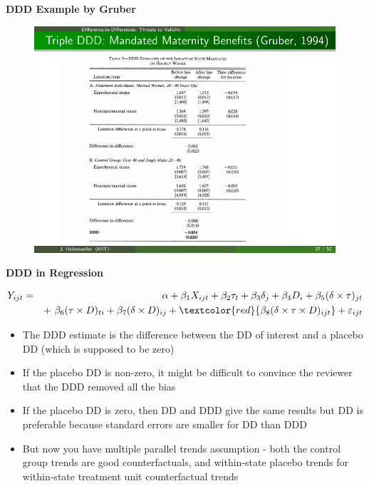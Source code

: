 \documentclass[notes=show]{beamer}
\begin{document}
\begin{frame}[plain]
	\begin{center}
	\textbf{DDD Example by Gruber}
	\end{center}
	
	\begin{figure}
	\includegraphics{./lecture_includes/gruber_ddd_3.pdf}
	\end{figure}
	
\end{frame}

\begin{frame}[plain]
	\begin{center}
	\textbf{DDD in Regression}
	\end{center}
	
	\begin{eqnarray*}
	Y_{ijt} &=& \alpha + \beta_1 X_{ijt} + \beta_2 \tau_t + \beta_3 \delta_j  + \beta_4 D_i + \beta_5(\delta \times \tau)_{jt} \\
	&& +\ \beta_6(\tau \times D)_{ti} +  \beta_7(\delta \times D)_{ij} +  \textcolor{red}{\beta_8(\delta \times \tau \times  D)_{ijt}}+  \varepsilon_{ijt}
	\end{eqnarray*}
	
	\begin{itemize}
	\item The DDD estimate is the difference between the DD of interest and a placebo DD (which is supposed to be zero)
	\item If the placebo DD is non-zero, it might be difficult to convince the reviewer that the DDD removed all the bias 
	\item If the placebo DD is zero, then DD and DDD give the same results but DD is preferable because standard errors are smaller for DD than DDD
	\item But now you have multiple parallel trends assumption - both the control group trends are good counterfactuals, and within-state placebo trends for within-state treatment unit counterfactual trends
	\end{itemize}
	
\end{frame}
\end{document}
